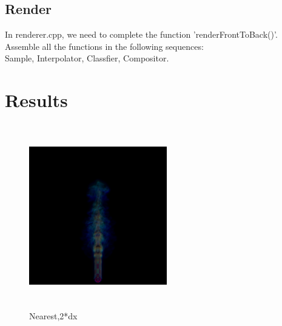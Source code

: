 \documentclass[acmtog]{acmart}
\begin{document}
\subsection{Render}
In renderer.cpp, we need to complete the function 'renderFrontToBack()'.
\\Assemble all the functions in the following sequences:
\\Sample, Interpolator, Classfier, Compositor.

\vspace*{2 ex}

\section{Results}

\begin{figure}[h]
\centering
\includegraphics[width=6cm,height=8cm]{Near+2.png}
\caption{Nearest,2*dx}
\end{figure}
\end{document}
